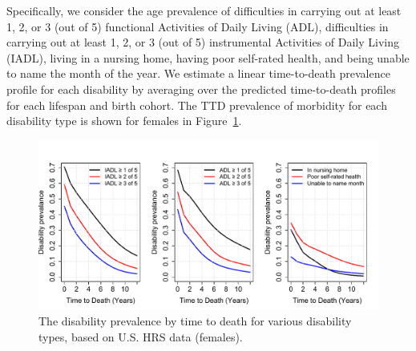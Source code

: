 \documentclass[12pt,oneside,a4paper]{article} %
\begin{document}
Specifically, we consider the age prevalence of difficulties in carrying out at
least 1, 2, or 3 (out of 5) functional Activities of Daily Living (ADL),
difficulties in carrying out at least 1, 2, or 3 (out of 5) instrumental
Activities of Daily Living (IADL), living in a nursing home, having poor
self-rated health, and being unable to name the month of the year. We estimate
a linear time-to-death prevalence profile for each disability by averaging over the predicted time-to-death profiles for each lifespan and birth cohort.
 The TTD prevalence of morbidity for
each disability type is shown for females in Figure~\ref{fig:DisbyTTD}.


\begin{figure}
\begin{adjustwidth}{-1.5cm}{}
	\centering
	\includegraphics[scale=.6]{Figures/DisbyTTDnew.pdf}
	\caption{The disability prevalence by time to death for various disability types, based on U.S. HRS data (females).}
	\label{fig:DisbyTTD}
\end{adjustwidth}
\end{figure}
\end{document}
